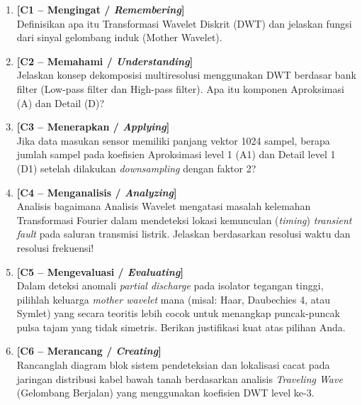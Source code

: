 \documentclass[11pt,a4paper]{article}
\begin{document}
\begin{enumerate}[leftmargin=1.8em, label=\textbf{Soal \arabic*.}]
    
    \item \textbf{[C1 -- Mengingat / \textit{Remembering}]} \\
    Definisikan apa itu Transformasi Wavelet Diskrit (DWT) dan jelaskan fungsi dari sinyal gelombang induk (Mother Wavelet).
    \vspace{2.2cm}

    \item \textbf{[C2 -- Memahami / \textit{Understanding}]} \\
    Jelaskan konsep dekomposisi multiresolusi menggunakan DWT berdasar bank filter (Low-pass filter dan High-pass filter). Apa itu komponen Aproksimasi (A) dan Detail (D)?
    \vspace{2.8cm}

    \item \textbf{[C3 -- Menerapkan / \textit{Applying}]} \\
    Jika data masukan sensor memiliki panjang vektor 1024 sampel, berapa jumlah sampel pada koefisien Aproksimasi level 1 (A1) dan Detail level 1 (D1) setelah dilakukan \textit{downsampling} dengan faktor 2?
    \vspace{2.8cm}

    \newpage

    \item \textbf{[C4 -- Menganalisis / \textit{Analyzing}]} \\
    Analisis bagaimana Analisis Wavelet mengatasi masalah kelemahan Transformasi Fourier dalam mendeteksi lokasi kemunculan (\textit{timing}) \textit{transient fault} pada saluran transmisi listrik. Jelaskan berdasarkan resolusi waktu dan resolusi frekuensi!
    \vspace{3.5cm}

    \item \textbf{[C5 -- Mengevaluasi / \textit{Evaluating}]} \\
    Dalam deteksi anomali \textit{partial discharge} pada isolator tegangan tinggi, pilihlah keluarga \textit{mother wavelet} mana (misal: Haar, Daubechies 4, atau Symlet) yang secara teoritis lebih cocok untuk menangkap puncak-puncak pulsa tajam yang tidak simetris. Berikan justifikasi kuat atas pilihan Anda.
    \vspace{3.5cm}

    \item \textbf{[C6 -- Merancang / \textit{Creating}]} \\
    Rancanglah diagram blok sistem pendeteksian dan lokalisasi cacat pada jaringan distribusi kabel bawah tanah berdasarkan analisis \textit{Traveling Wave} (Gelombang Berjalan) yang menggunakan koefisien DWT level ke-3.
    \vspace{4.5cm}

\end{enumerate}
\end{document}

